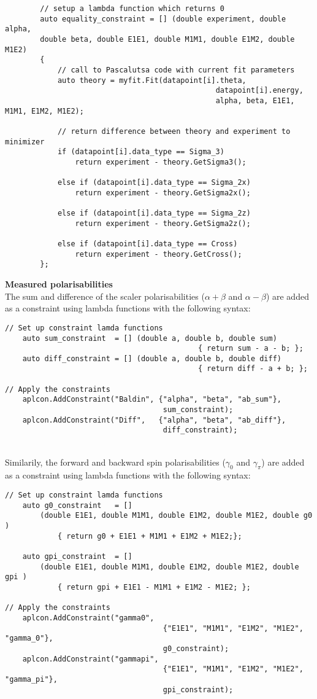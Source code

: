 \documentclass[]{article}
\begin{document}
\begin{lstlisting}
        // setup a lambda function which returns 0
        auto equality_constraint = [] (double experiment, double alpha, 
        double beta, double E1E1, double M1M1, double E1M2, double M1E2) 
        {
	        // call to Pascalutsa code with current fit parameters
	        auto theory = myfit.Fit(datapoint[i].theta, 
										        datapoint[i].energy,
										        alpha, beta, E1E1, M1M1, E1M2, M1E2);       
        
	        // return difference between theory and experiment to minimizer
	        if (datapoint[i].data_type == Sigma_3)
				return experiment - theory.GetSigma3();
				
	        else if (datapoint[i].data_type == Sigma_2x)
				return experiment - theory.GetSigma2x();
				
	        else if (datapoint[i].data_type == Sigma_2z)
				return experiment - theory.GetSigma2z();
				
	        else if (datapoint[i].data_type == Cross)
				return experiment - theory.GetCross();
        };
\end{lstlisting}

\noindent \textbf{Measured polarisabilities} \\

The sum and difference of the scaler polarisabilities ($\alpha+\beta$ and $\alpha-\beta$) are added as a constraint using lambda functions with the following syntax: 

\begin{lstlisting}
// Set up constraint lamda functions
    auto sum_constraint  = [] (double a, double b, double sum)
										    { return sum - a - b; };
    auto diff_constraint = [] (double a, double b, double diff)
										    { return diff - a + b; };
    
// Apply the constraints
    aplcon.AddConstraint("Baldin", {"alpha", "beta", "ab_sum"},  
									sum_constraint);
    aplcon.AddConstraint("Diff",   {"alpha", "beta", "ab_diff"}, 
								    diff_constraint);
\end{lstlisting}

\noindent \\Similarily, the forward and backward spin polarisabilities ($\gamma_0$ and $\gamma_{\pi}$) are added as a constraint using lambda functions with the following syntax: 

\begin{lstlisting}
// Set up constraint lamda functions
    auto g0_constraint   = [] 
	    (double E1E1, double M1M1, double E1M2, double M1E2, double g0 )
		    { return g0 + E1E1 + M1M1 + E1M2 + M1E2;};
		    
    auto gpi_constraint  = [] 
	    (double E1E1, double M1M1, double E1M2, double M1E2, double gpi )
		    { return gpi + E1E1 - M1M1 + E1M2 - M1E2; };
    
// Apply the constraints
    aplcon.AddConstraint("gamma0", 
								    {"E1E1", "M1M1", "E1M2", "M1E2", "gamma_0"},  
								    g0_constraint);
    aplcon.AddConstraint("gammapi",
								    {"E1E1", "M1M1", "E1M2", "M1E2", "gamma_pi"}, 
								    gpi_constraint);

\end{lstlisting}
\end{document}
